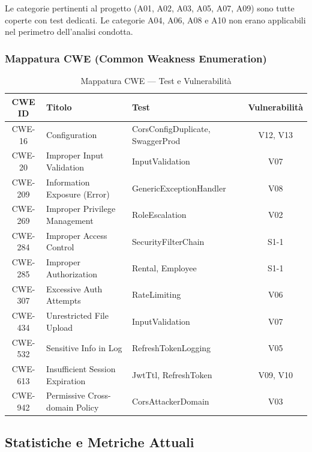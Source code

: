 \documentclass[12pt, a4paper]{article}
\begin{document}
    Le categorie pertinenti al progetto (A01, A02, A03, A05, A07, A09) sono tutte coperte
    con test dedicati. Le categorie A04, A06, A08 e A10 non erano applicabili nel perimetro
    dell'analisi condotta.

    \subsubsection{Mappatura CWE (Common Weakness Enumeration)}

    \begin{table}[H]
        \centering
        \small
        \begin{tabular}{|c|l|l|c|}
            \hline
            \textbf{CWE ID} & \textbf{Titolo} & \textbf{Test} & \textbf{Vulnerabilità} \\
            \hline
            CWE-16 & Configuration & CorsConfigDuplicate, SwaggerProd & V12, V13 \\
            CWE-20 & Improper Input Validation & InputValidation & V07 \\
            CWE-209 & Information Exposure (Error) & GenericExceptionHandler & V08 \\
            CWE-269 & Improper Privilege Management & RoleEscalation & V02 \\
            CWE-284 & Improper Access Control & SecurityFilterChain & S1-1 \\
            CWE-285 & Improper Authorization & Rental, Employee & S1-1 \\
            CWE-307 & Excessive Auth Attempts & RateLimiting & V06 \\
            CWE-434 & Unrestricted File Upload & InputValidation & V07 \\
            CWE-532 & Sensitive Info in Log & RefreshTokenLogging & V05 \\
            CWE-613 & Insufficient Session Expiration & JwtTtl, RefreshToken & V09, V10 \\
            CWE-942 & Permissive Cross-domain Policy & CorsAttackerDomain & V03 \\
            \hline
        \end{tabular}
        \caption{Mappatura CWE — Test e Vulnerabilità}
        \label{tab:cwe_mapping}
    \end{table}

    \subsection{Statistiche e Metriche Attuali}
    \label{subsec:metrics}
\end{document}
